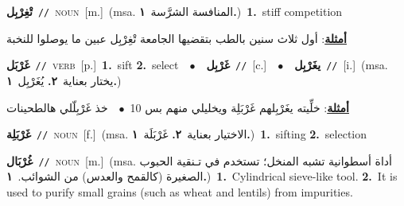 \documentclass[10pt,a4paper,twoside]{article} %
\begin{document}
\begin{multicols}{2}
{\setlength\topsep{0pt}\textbf{\foreignlanguage{arabic}{تْغِرْبِل}}\ {\color{gray}\texttt{//}\color{black}}\ \textsc{noun}\ [m.]\ \color{gray}(msa. \foreignlanguage{arabic}{المنافسة الشرَّسة}~\foreignlanguage{arabic}{\textbf{١.}})\color{black}\ \textbf{1.}~stiff competition\  \begin{flushright}\color{gray}\foreignlanguage{arabic}{\textbf{\underline{\foreignlanguage{arabic}{أمثلة}}}: أول ثلاث سنين بالطب بتقضيها الجامعة تْغِرْبِل عبين ما يوصلوا للنخبة}\end{flushright}\color{black}} \vspace{2mm}

{\setlength\topsep{0pt}\textbf{\foreignlanguage{arabic}{غَرْبَل}}\ {\color{gray}\texttt{//}\color{black}}\ \textsc{verb}\ [p.]\ \textbf{1.}~sift  \textbf{2.}~select\ \ $\bullet$\ \ \setlength\topsep{0pt}\textbf{\foreignlanguage{arabic}{غَرْبِل}}\ {\color{gray}\texttt{//}\color{black}}\ [c.]\ \ $\bullet$\ \ \setlength\topsep{0pt}\textbf{\foreignlanguage{arabic}{يغَرْبِل}}\ {\color{gray}\texttt{//}\color{black}}\ [i.]\ \color{gray}(msa. \foreignlanguage{arabic}{يختار بعناية}~\foreignlanguage{arabic}{\textbf{٢.}}  \foreignlanguage{arabic}{يُغَرْبِل}~\foreignlanguage{arabic}{\textbf{١.}})\color{black}\  \begin{flushright}\color{gray}\foreignlanguage{arabic}{\textbf{\underline{\foreignlanguage{arabic}{أمثلة}}}: خلِّيته يغَرْبِلهم غَرْبَلِة ويخليلي منهم بس 10\ $\bullet$\ \  خذ غَرْبِلّلي هالطحينات}\end{flushright}\color{black}} \vspace{2mm}

{\setlength\topsep{0pt}\textbf{\foreignlanguage{arabic}{غَرْبَلِة}}\ {\color{gray}\texttt{//}\color{black}}\ \textsc{noun}\ [f.]\ \color{gray}(msa. \foreignlanguage{arabic}{الاختيار بعناية}~\foreignlanguage{arabic}{\textbf{٢.}}  \foreignlanguage{arabic}{غَرْبَلَة}~\foreignlanguage{arabic}{\textbf{١.}})\color{black}\ \textbf{1.}~sifting  \textbf{2.}~selection\ } \vspace{2mm}

{\setlength\topsep{0pt}\textbf{\foreignlanguage{arabic}{غُرْبَال}}\ {\color{gray}\texttt{//}\color{black}}\ \textsc{noun}\ [m.]\ \color{gray}(msa. \foreignlanguage{arabic}{أداة أسطوانية تشبه المنخل؛ تستخدم في تـنقية الحبوب الصغيرة (كالقمح والعدس) من الشوائب.}~\foreignlanguage{arabic}{\textbf{١.}})\color{black}\ \textbf{1.}~Cylindrical sieve-like tool.  \textbf{2.}~It is used to purify small grains (such as wheat and lentils) from impurities.\ } \vspace{2mm}


\end{multicols}
\end{document}
